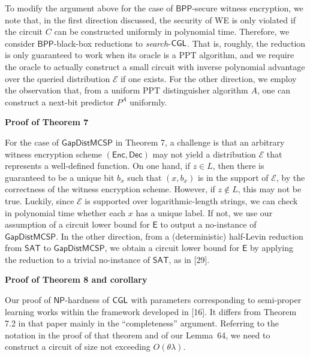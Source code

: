 To modify the argument above for the case of ${\mathsf{BPP}}$-secure witness encryption, we note that, in the first direction discussed, the security of WE is only violated if the circuit $C$ can be constructed uniformly in polynomial time. Therefore, we consider ${\mathsf{BPP}}$-black-box reductions to \emph{search}-${\sf CGL}$. That is, roughly, the reduction is only guaranteed to work when its oracle is a PPT algorithm, and we require the oracle to actually construct a small circuit with inverse polynomial advantage over the queried distribution $\mathcal{E}$ if one exists. For the other direction, we employ the observation that, from a uniform PPT distinguisher algorithm $A$, one can construct a next-bit predictor $P^{A}$ uniformly.\par





\par\medskip\noindent\textbf{Proof of Theorem 7
}\par




For the case of ${\mathsf{GapDistMCSP}}$ in Theorem 7, a challenge is that an arbitrary witness encryption scheme $({\mathsf{Enc}},{\mathsf{Dec}})$ may not yield a distribution $\mathcal{E}$ that represents a well-defined function. On one hand, if $z\in L$, then there is guaranteed to be a unique bit $b_{x}$ such that $(x,b_{x})$ is in the support of $\mathcal{E}$, by the correctness of the witness encryption scheme. However, if $z\notin L$, this may not be true. Luckily, since $\mathcal{E}$ is supported over logarithmic-length strings, we can check in polynomial time whether each $x$ has a unique label. If not, we use our assumption of a circuit lower bound for ${\mathsf{E}}$ to output a no-instance of ${\mathsf{GapDistMCSP}}$. In the other direction, from a (deterministic) half-Levin reduction from ${\mathsf{SAT}}$ to ${\mathsf{GapDistMCSP}}$, we obtain a circuit lower bound for ${\mathsf{E}}$ by applying the reduction to a trivial no-instance of ${\mathsf{SAT}}$, as in [29].\par





\par\medskip\noindent\textbf{Proof of Theorem 8 and corollary}\par




Our proof of ${\mathsf{NP}}$-hardness of ${\sf CGL}$ with parameters corresponding to semi-proper learning works within the framework developed in [16]. It differs from Theorem 7.2 in that paper mainly in the “completeness” argument. Referring to the notation in the proof of that theorem and of our Lemma 64, we need to construct a circuit of size not exceeding $O(\theta\lambda)$.\par




